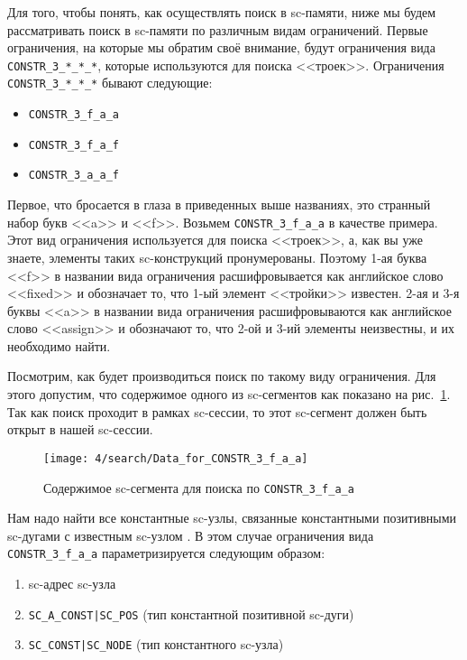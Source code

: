 Для того, чтобы понять, как осуществлять поиск в sc-памяти, ниже мы
будем рассматривать поиск в sc-памяти по различным видам
ограничений. Первые ограничения, на которые мы обратим своё внимание,
будут ограничения вида \lstinline|CONSTR_3_*_*_*|, которые
используются для поиска <<троек>>. Ограничения
\lstinline|CONSTR_3_*_*_*| бывают следующие:

\begin{itemize}
\item \lstinline|CONSTR_3_f_a_a|
\item \lstinline|CONSTR_3_f_a_f|
\item \lstinline|CONSTR_3_a_a_f|
\end{itemize}

Первое, что бросается в глаза в приведенных выше названиях, это
странный набор букв <<a>> и <<f>>. Возьмем \lstinline|CONSTR_3_f_a_a|
в качестве примера. Этот вид ограничения используется для поиска
<<троек>>, а, как вы уже знаете, элементы таких sc-конструкций
пронумерованы. Поэтому 1-ая буква <<f>> в названии вида ограничения
расшифровывается как английское слово <<fixed>> и обозначает то, что
1-ый элемент <<тройки>> известен. 2-ая и 3-я буквы <<a>> в названии
вида ограничения расшифровываются как английское слово <<assign>> и
обозначают то, что 2-ой и 3-ий элементы неизвестны, и их необходимо
найти.

Посмотрим, как будет производиться поиск по такому виду
ограничения. Для этого допустим, что содержимое одного из sc-сегментов
как показано на рис.~\ref{fig:Data_for_CONSTR_3_f_a_a}. Так как поиск
проходит в рамках sc-сессии, то этот sc-сегмент должен быть открыт в
нашей sc-сессии.

\begin{figure}[h!]
  \centering
  \texttt{[image: 4/search/Data\_for\_CONSTR\_3\_f\_a\_a]}
  \caption{Содержимое sc-сегмента для поиска по
    \lstinline|CONSTR_3_f_a_a|}
  \label{fig:Data_for_CONSTR_3_f_a_a}
\end{figure}

Нам надо найти все константные sc-узлы, связанные константными
позитивными sc-дугами с известным sc-узлом . В этом случае
ограничения вида \lstinline|CONSTR_3_f_a_a| параметризируется
следующим образом:

\begin{enumerate}
\item sc-адрес sc-узла 
\item \lstinline+SC_A_CONST|SC_POS+ (тип константной позитивной sc-дуги)
\item \lstinline+SC_CONST|SC_NODE+ (тип константного sc-узла)
\end{enumerate}

